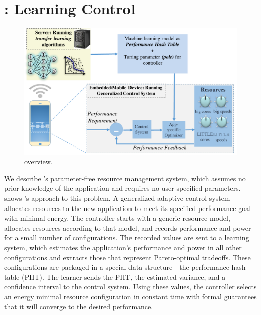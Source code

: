 \section{\SYSTEM{}: Learning Control}
\label{sec:framework}



\begin{figure}
  \includegraphics[width=\columnwidth]{figures/Overview.pdf}
  \caption{\SYSTEM{} overview.}
  \label{fig:overview}
\end{figure}


We describe \SYSTEM{}'s parameter-free resource management system,
which assumes no prior knowledge of the application and requires no
user-specified parameters.   shows \SYSTEM{}'s
approach to this problem.  A generalized adaptive control system
allocates resources to the new application to meet its specified
performance goal with minimal energy.  The controller starts with a
generic resource model, allocates resources according to that model,
and records performance and power for a small number of
configurations.  The recorded values are sent to a learning system,
which estimates the application's performance and power in all other
configurations and extracts those that represent Pareto-optimal
tradeoffs.  These configurations are packaged in a special data
structure---the performance hash table (PHT).  The learner sends the
PHT, the estimated variance, and a confidence interval to the control
system.  Using these values, the controller selects an energy minimal
resource configuration in constant time with formal guarantees that it
will converge to the desired performance.


